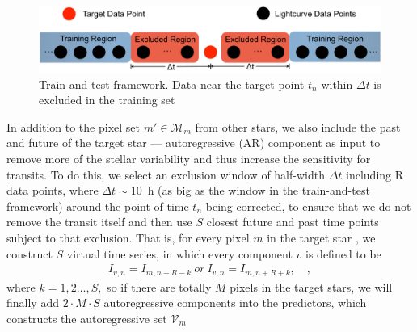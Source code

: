 \documentclass[12pt, preprint]{aastex}
\newcommand{\set}[1]{\mathcal{#1}}
\begin{document}
\begin{figure}[htb]
\centering
\includegraphics[width=0.8\columnwidth]{train_and_test}
\caption{
  \label{train-and-test} 
  Train-and-test framework. 
  Data near the target point $t_{n}$ within $\Delta t$ is excluded in the training set}
\end{figure}

In addition to the pixel set $m'\in\set{M}_m$ from other stars,  
  we also include the past and future of the target star --- autoregressive (AR) component as input 
  to remove more of the stellar variability and thus increase the sensitivity for transits. 
To do this, we select an exclusion window of half-width $\Delta t$ including R data points, 
  where $\Delta t\sim 10$\, h (as big as the window in the train-and-test framework) 
  around the point of time $t_{n}$ being corrected, 
  to ensure that we do not remove the transit itself 
  and then use $S$ closest future and past time points subject to that exclusion. 
That is, for every pixel $m$ in the target star , we construct $S$ virtual time series, 
  in which every component $v$ is defined to be     
\begin{eqnarray}
I_{v,n} = I_{m,n-R-k}\ or\ I_{v,n} = I_{m,n+R+k},
\quad,
\end{eqnarray}
where $k = 1, 2\dots, S,$ so if there are totally $M$ pixels in the target stars, 
  we will finally add $2\cdot M\cdot S$
  autoregressive components into the predictors, which constructs the autoregressive set $\set{V}_m$
\end{document}
